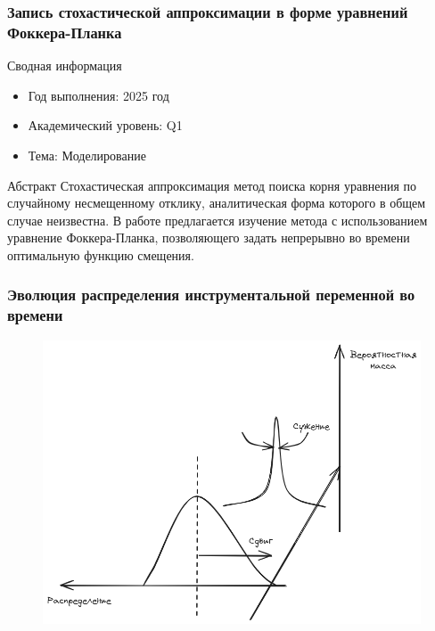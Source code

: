 \begin{frame}
    \frametitle{Запись стохастической аппроксимации в форме уравнений Фоккера-Планка}
    \centering
    \begin{block}{Сводная информация}
        \begin{itemize}
            \item Год выполнения: 2025 год
            \item Академический уровень: Q1
            \item Тема: Моделирование
        \end{itemize}
    \end{block}  
    \begin{block}{Абстракт}
        Стохастическая аппроксимация метод поиска корня
        уравнения по случайному несмещенному отклику, аналитическая
        форма которого в общем случае неизвестна. В работе предлагается 
        изучение метода с использованием уравнение Фоккера-Планка, позволяющего задать непрерывно во времени
        оптимальную функцию смещения. 
    \end{block}
\end{frame}

\begin{frame}
    \frametitle{Эволюция распределения инструментальной переменной во времени}
    \centering
    \begin{figure}
        \includegraphics[width=0.85\linewidth]{assets/continious.excalidraw.png}
    \end{figure}
\end{frame}

